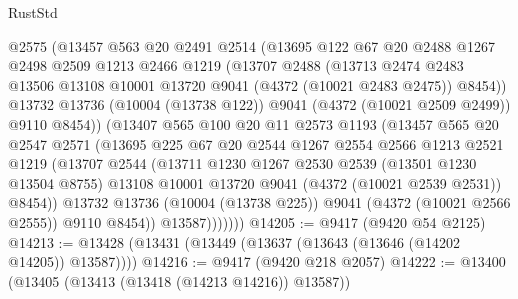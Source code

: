 \begin{lexlean}{RustStd}
\begin{coremodule}
                @2575
                (@13457
                  @563
                  @20
                  @2491
                  @2514
                  (@13695
                    @122
                    @67
                    @20
                    @2488
                    @1267
                    @2498
                    @2509
                    @1213
                    @2466
                    @1219
                    (@13707
                      @2488
                      (@13713
                        @2474
                        @2483
                        @13506
                        @13108
                        @10001
                        @13720
                        @9041
                        (@4372 (@10021 @2483 @2475))
                        @8454))
                    @13732
                    @13736
                    (@10004 (@13738 @122))
                    @9041
                    (@4372 (@10021 @2509 @2499))
                    @9110
                    @8454))
                (@13407
                  @565
                  @100
                  @20
                  @11
                  @2573
                  @1193
                  (@13457
                    @565
                    @20
                    @2547
                    @2571
                    (@13695
                      @225
                      @67
                      @20
                      @2544
                      @1267
                      @2554
                      @2566
                      @1213
                      @2521
                      @1219
                      (@13707
                        @2544
                        (@13711
                          @1230
                          @1267
                          @2530
                          @2539
                          (@13501 @1230 @13504 @8755)
                          @13108
                          @10001
                          @13720
                          @9041
                          (@4372 (@10021 @2539 @2531))
                          @8454))
                      @13732
                      @13736
                      (@10004 (@13738 @225))
                      @9041
                      (@4372 (@10021 @2566 @2555))
                      @9110
                      @8454))
                  @13587)))))))
@14205 := @9417 (@9420 @54 @2125)
@14213 := @13428 (@13431 (@13449 (@13637 (@13643 (@13646 (@14202 @14205)) @13587))))
@14216 := @9417 (@9420 @218 @2057)
@14222 := @13400 (@13405 (@13413 (@13418 (@14213 @14216)) @13587))

\end{coremodule}
\end{lexlean}
